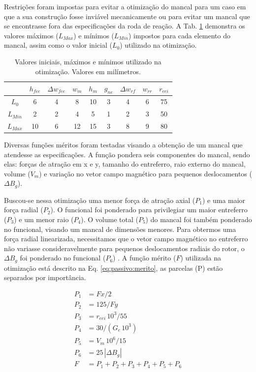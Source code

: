 Restrições foram impostas para evitar a otimização do mancal para um caso em que a sua construção fosse inviável mecanicamente ou para evitar um mancal que se encontrasse fora das especificações da roda de reação. A Tab. \ref{tab:passivo:restrições} demonstra os valores máximos ($L_{Max}$) e mínimos ($L_{Min}$) impostos para cada elemento do mancal, assim como o valor inicial ($L_0$) utilizado na otimização.


\begin{table}[ht!]
	\centering
	\begin{tabular}{c c c c c c c c c}
		& $h_{fee}$ &$\Delta w_{fee}$ & $w_m$ & $h_m$  & $g_{ne}$ & $\Delta w_{rf}$ & $w_{rr}$ & $r_{eei}$ \\ \hline \hline
		
		$L_{0}$ 	&  6 &   4 &    8 &    10 &   3 &  4 &   6 &    75 \\
		$L_{Min}$ &  2    &  2   &  4  &   5&    1  & 2  &  3&    50\\			
		$L_{Max}$ &  10 &  6 &  12  &   15  &  3  &  8  &   9   &   80		
	\end{tabular} 
	\caption{Valores iniciais, máximos e mínimos utilizado na otimização. Valores em milímetros.}
	\label{tab:passivo:restrições} 
\end{table}

Diversas funções méritos foram testadas visando a obtenção de um mancal que atendesse as especificações. A função pondera seis componentes do mancal, sendo elas: forças de atração em x e y, tamanho do entreferro, raio externo do mancal,  volume ($V_m$) e variação no vetor campo magnético para pequenos deslocamentos ($\Delta B_{g}$).

Buscou-se nessa otimização uma menor força de atração axial ($P_1$) e uma maior força radial ($P_2$). O funcional foi ponderado para privilegiar um maior entreferro ($P_3$) e um menor raio ($P_4$). O volume total ($P_5$) do mancal foi também ponderado no funcional, visando um mancal de dimensões menores. Para obtermos uma força radial linearizada, necessitamos que o vetor campo magnético no entreferro não variasse consideravelmente para pequenos deslocamentos radiais do rotor, o $\Delta B_{g}$ foi ponderado no funcional ($P_6$) . A função mérito ($F$) utilizada na otimização está descrito na Eq. \ref{eq:passivo:merito}, as parcelas (P) estão separados por importância.

\begin{align}
P_1 &= Fx/2 				\\ 
P_2 &= 125/Fy		\\        
P_3 &= r_{eei}\, 10^3/55 \\     
P_4&= 30/(G_e \,  10^3) \\    
P_5 &= V_m\, 10^6/15 \\        
P_6 &= 25 \,  |{\Delta B_{g}}|\\   
F &= P_1 + P_2 + P_3 + P_4 + P_5 + P_6   \label{eq:passivo:merito}
\end{align}

